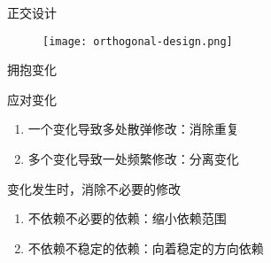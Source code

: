 \begin{frame}{正交设计}
  \begin{figure}
    \centering
    \texttt{[image: orthogonal-design.png]}
  \end{figure}
\end{frame}

\begin{frame}{拥抱变化}
  \begin{block}{应对变化} 
    \begin{enumerate}
    \item \alert{一个变化导致多处散弹修改}：消除重复
    \item \alert{多个变化导致一处频繁修改}：分离变化
    \end{enumerate}
  \end{block}

  \begin{block}{变化发生时，消除不必要的修改} 
    \begin{enumerate}
    \item \alert{不依赖不必要的依赖}：缩小依赖范围
    \item \alert{不依赖不稳定的依赖}：向着稳定的方向依赖
    \end{enumerate}
  \end{block}
\end{frame}
